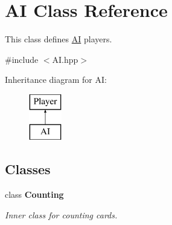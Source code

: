 \hypertarget{classAI}{\section{\-A\-I \-Class \-Reference}
\label{classAI}
}


\-This class defines \hyperlink{classAI}{\-A\-I} players.  




{\ttfamily \#include $<$\-A\-I.\-hpp$>$}

\-Inheritance diagram for \-A\-I\-:\begin{figure}[H]
\begin{center}
\leavevmode
\includegraphics[height=2.000000cm]{classAI}
\end{center}
\end{figure}
\subsection*{\-Classes}
\begin{DoxyCompactItemize}
\item 
class {\bfseries \-Counting}
\begin{DoxyCompactList}\small\item\em \-Inner class for counting cards. \end{DoxyCompactList}\end{DoxyCompactItemize}
